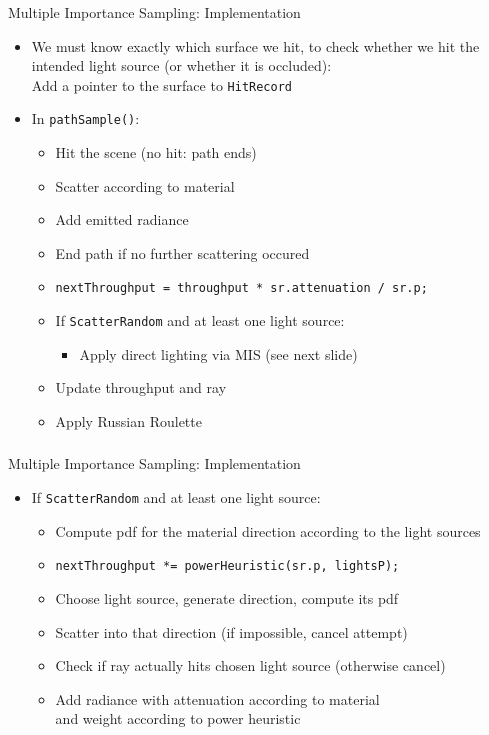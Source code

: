 \documentclass[utf8,stillsansserifmath,fleqn,t]{beamer}
\newcommand{\code}[1]{\texttt{#1}}
\begin{document}
\begin{frame}
\frametitle{\insertsection}
Multiple Importance Sampling: Implementation
\begin{itemize}
\item We must know exactly which surface we hit, to check whether
we hit the intended light source (or whether it is occluded):\\
Add a pointer to the surface to \code{HitRecord}
\item In \code{pathSample()}:
    \begin{itemize}
    \item Hit the scene (no hit: path ends)
    \item Scatter according to material
    \item Add emitted radiance
    \item End path if no further scattering occured
    \item \code{nextThroughput = throughput * sr.attenuation / sr.p;}
    \item If \code{ScatterRandom} and at least one light source:
        \begin{itemize}
        \item Apply direct lighting via MIS (see next slide)
        \end{itemize}
    \item Update throughput and ray
    \item Apply Russian Roulette
    \end{itemize}
\end{itemize}
\end{frame}

\begin{frame}
\frametitle{\insertsection}
Multiple Importance Sampling: Implementation
\begin{itemize}
    \item If \code{ScatterRandom} and at least one light source:
        \begin{itemize}
        \item Compute pdf for the material direction according to the light sources
        \item \code{nextThroughput *= powerHeuristic(sr.p, lightsP);}
        \item Choose light source, generate direction, compute its pdf
        \item Scatter into that direction (if impossible, cancel attempt)
        \item Check if ray actually hits chosen light source (otherwise cancel)
        \item Add radiance with attenuation according to material\\
        and weight according to power heuristic
        \end{itemize}
\end{itemize}
\end{frame}
\end{document}

